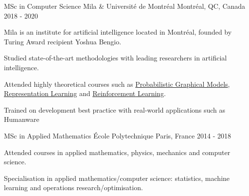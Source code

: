 \begin{cventries}
    \cventry
    {MSc in Computer Science} %
    {Mila \& Université de Montréal} %
    {Montréal, QC, Canada} %
    {2018 - 2020} %
    {
            Mila is an institute for artificial intelligence located in Montréal, founded by Turing Award recipient Yoshua Bengio.
        \vspace{5mm}
        \begin{cvitems}
            \item Studied state-of-the-art methodologies with leading researchers in artificial intelligence.
            \item Attended highly theoretical courses such as \href{www.iro.umontreal.ca/~slacoste/teaching/ift6269/A18/}{Probabilistic Graphical Models}, \href{https://sites.google.com/mila.quebec/ift6135/lectures}{Representation Learning} and \href{https://www.cs.mcgill.ca/~dprecup/courses/RL/syllabus.html}{Reinforcement Learning}.
            \item Trained on development best practice with real-world applications such as Humanware
        \end{cvitems}
    }
    
    \cventry
    {MSc in Applied Mathematics} %
    {École Polytechnique} %
    {Paris, France} %
    {2014 - 2018} %
    {
        \begin{cvitems} %
        \item Attended courses in applied mathematics, physics, mechanics and computer science.
        \item Specialisation in applied mathematics/computer science: statistics, machine learning and operations research/optimisation.
      \end{cvitems}
    }
    

\end{cventries}
